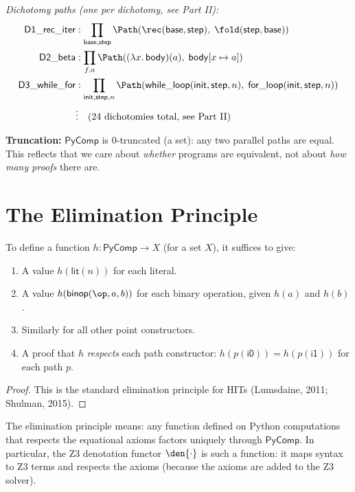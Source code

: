 \begin{definition}
\emph{Dichotomy paths (one per dichotomy, see Part II):}
\begin{align}
  \mathsf{D1\_rec\_iter} &: \prod_{\mathsf{base}, \mathsf{step}}
    \Path(\rec(\mathsf{base}, \mathsf{step}),\;
    \fold(\mathsf{step}, \mathsf{base})) \\
  \mathsf{D2\_beta} &: \prod_{f, a}
    \Path((\lambda x.\, \mathsf{body})(a),\;
    \mathsf{body}[x \mapsto a]) \\
  \mathsf{D3\_while\_for} &: \prod_{\mathsf{init}, \mathsf{step}, n}
    \Path(\mathsf{while\_loop}(\mathsf{init}, \mathsf{step}, n),\;
    \mathsf{for\_loop}(\mathsf{init}, \mathsf{step}, n)) \\
  &\vdots \quad \text{(24 dichotomies total, see Part II)}
\end{align}

\textbf{Truncation:}
$\mathsf{PyComp}$ is 0-truncated (a set): any two parallel paths
are equal.  This reflects that we care about \emph{whether} programs
are equivalent, not about \emph{how many proofs} there are.
\end{definition}

\section{The Elimination Principle}

\begin{theorem}
\label{thm:pycomp-elim}
To define a function $h : \mathsf{PyComp} \to X$ (for a set $X$),
it suffices to give:
\begin{enumerate}
  \item A value $h(\mathsf{lit}(n))$ for each literal.
  \item A value $h(\mathsf{binop}(\op, a, b))$ for each binary operation,
    given $h(a)$ and $h(b)$.
  \item Similarly for all other point constructors.
  \item A proof that $h$ \emph{respects} each path constructor:
    $h(p(\mathsf{i0})) = h(p(\mathsf{i1}))$ for each path $p$.
\end{enumerate}
\end{theorem}

\begin{proof}
This is the standard elimination principle for HITs
(Lumsdaine, 2011; Shulman, 2015).
\end{proof}

The elimination principle means: any function defined on Python
computations that respects the equational axioms factors uniquely
through $\mathsf{PyComp}$.  In particular, the Z3 denotation functor
$\den{\cdot}$ is such a function: it maps syntax to Z3 terms and
respects the axioms (because the axioms are added to the Z3 solver).

